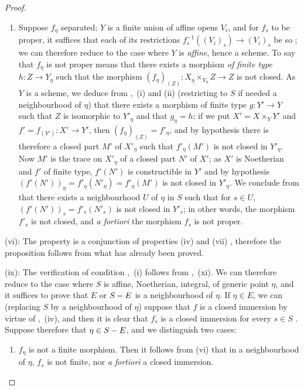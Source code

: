 \begin{proof}
\begin{enumerate}[label=\upshape{$\arabic{enumi}^\circ$}]
  \item Suppose $f_\eta$ separated; $Y$ is a finite union of affine opens $V_i$, and for $f_s$ to be proper, it suffices that each of its restrictions $f_s^{-1}((V_i)_s)\to(V_i)_s$ be so ; we can therefore reduce to the case where $Y$ is \emph{affine}, hence a scheme.
  To say that $f_\eta$ is not proper means  that there exists a morphism \emph{of finite type} $h:Z\to Y_\eta$ such that the morphism $(f_\eta)_{(Z)}:X_\eta\times_{Y_\eta} Z\to Z$ is not closed.
  As $Y$ is a scheme, we deduce from ,~(i) and (ii) (restricting to $S$ if needed a neighbourhood of $\eta$) that there exists a morphism of finite type $g:Y'\to Y$ such that $Z$ is isomorphic to $Y'_\eta$ and that $g_\eta=h$;
  if we put $X'=X\times_Y Y'$ and $f'=f_{(Y')}:X'\to Y'$, then $(f_\eta)_{(Z)}=f'_\eta$, and by hypothesis there is therefore a closed part $M'$ of $X'_\eta$ such that $f'_\eta(M')$ is not closed in $Y'_\eta$.
  Now $M'$ is the trace on $X'_\eta$ of a closed part $N'$ of $X'$; as $X'$ is Noetherian and $f'$ of finite type, $f'(N')$ is constructible in $Y'$  and by hypothesis $(f'(N'))_\eta=f'_\eta(N'_\eta)=f'_\eta(M')$ is not closed in $Y'_\eta$.
  We conclude from  that there exists a neighbourhood $U$ of $\eta$ in $S$ such that for $s\in U$, $(f'(N'))_s=f'_s(N'_s)$ is not closed in $Y'_s$; in other words, the morphism $f'_s$ is not closed, and \emph{a fortiori} the morphism $f_s$ is not proper.
\end{enumerate}

(vi): The property is a conjunction of properties (iv) and (vii) , therefore the proposition follows from what has already been proved.

(ix): The verification of condition ,~(i) follows from ,~(xi).
We can therefore reduce to the case where $S$ is affine, Noetherian, integral, of generic point $\eta$, and it suffices to prove that $E$ or $S- E$ is a neighbourhood of $\eta$.
If $\eta\in E$, we can (replacing $S$ by a neighbourhood of $\eta$) suppose that $f$ is a closed immersion by virtue of ,~(iv), and then it is clear that $f_s$ is a closed immersion for every $s\in S$ .
Suppose therefore that $\eta\in S- E$, and we distinguish two cases:
\begin{enumerate}[label=\upshape{$\arabic{enumi}^\circ$}]
  \item $f_\eta$ is not a finite morphism.
  Then it follows from (vi) that in a neighbourhood of $\eta$, $f_s$ is not finite, nor \emph{a fortiori} a closed immersion.


\end{enumerate}
\end{proof}
